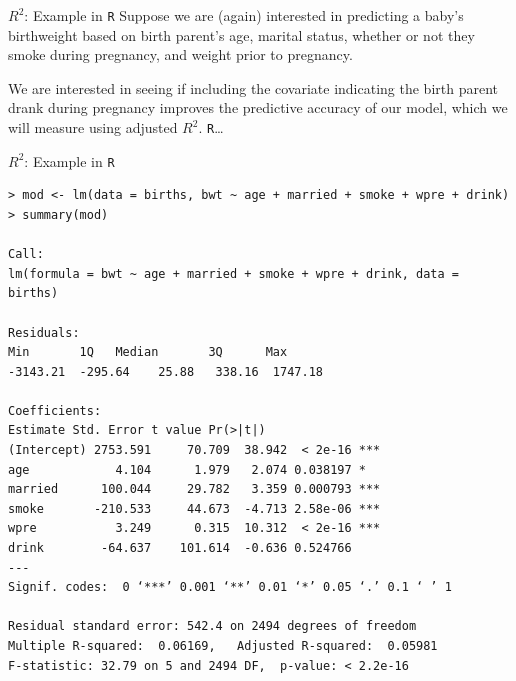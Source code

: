 \documentclass[10pt,t]{beamer}
\begin{document}
\begin{frame}{$R^2$: Example in \texttt{R}}
Suppose we are (again) interested in predicting a baby's birthweight based on birth parent's age, marital status, whether or not they smoke during pregnancy, and weight prior to pregnancy. 

\bigskip

We are interested in seeing if including the covariate indicating the birth parent drank during pregnancy improves the predictive accuracy of our model, which we will measure using adjusted $R^2$.  \texttt{R}\dots


\end{frame}

\begin{frame}[fragile]{$R^2$: Example in \texttt{R}}
	
	\vspace{-8 mm}
	
	\footnotesize
	
\begin{verbatim}
> mod <- lm(data = births, bwt ~ age + married + smoke + wpre + drink)
> summary(mod)

Call:
lm(formula = bwt ~ age + married + smoke + wpre + drink, data = births)

Residuals:
Min       1Q   Median       3Q      Max 
-3143.21  -295.64    25.88   338.16  1747.18 

Coefficients:
Estimate Std. Error t value Pr(>|t|)    
(Intercept) 2753.591     70.709  38.942  < 2e-16 ***
age            4.104      1.979   2.074 0.038197 *  
married      100.044     29.782   3.359 0.000793 ***
smoke       -210.533     44.673  -4.713 2.58e-06 ***
wpre           3.249      0.315  10.312  < 2e-16 ***
drink        -64.637    101.614  -0.636 0.524766    
---
Signif. codes:  0 ‘***’ 0.001 ‘**’ 0.01 ‘*’ 0.05 ‘.’ 0.1 ‘ ’ 1

Residual standard error: 542.4 on 2494 degrees of freedom
Multiple R-squared:  0.06169,	Adjusted R-squared:  0.05981 
F-statistic: 32.79 on 5 and 2494 DF,  p-value: < 2.2e-16
\end{verbatim}
\end{frame}
\end{document}
